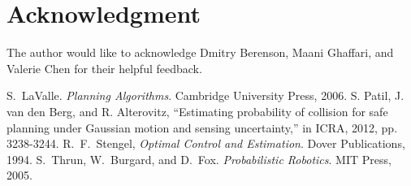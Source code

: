\documentclass[journal]{IEEEtran}
\begin{document}
\section*{Acknowledgment}
The author would like to acknowledge Dmitry Berenson, Maani Ghaffari, and Valerie Chen for their helpful feedback.

\ifCLASSOPTIONcaptionsoff
  \newpage
\fi





%
%
%
\begin{thebibliography}{1}


 S.~LaValle. \emph{Planning Algorithms}. Cambridge University Press, 2006.
 S. Patil, J. van den Berg, and R. Alterovitz, “Estimating probability of collision for safe planning under Gaussian motion and sensing uncertainty,” in ICRA, 2012, pp. 3238-3244.
 R.~F.~Stengel, \emph{Optimal Control and Estimation}. Dover Publications, 1994.
 S.~Thrun, W.~Burgard, and D.~Fox. \emph{Probabilistic Robotics}. MIT Press, 2005.

\end{thebibliography}

% 
\end{document}
